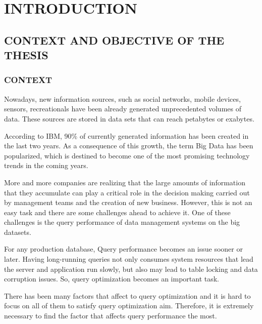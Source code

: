 
\chapter{INTRODUCTION}\label{chapter:introduction}

\section{CONTEXT AND OBJECTIVE OF THE THESIS}
\subsection{CONTEXT}
\begin{flushleft}
{\justify 
Nowadays, new information sources, such as social networks, mobile devices, sensors, recreationals have been already generated unprecedented volumes of data. These sources are stored in data sets that can reach petabytes or exabytes.
\par}
\vspace{0.5cm}
{\justify 
According to IBM, 90\% of currently generated information has been created in the last two years. As a consequence of this growth, the term Big Data has been popularized, which is destined to become one of the most promising technology trends in the coming years.
\par}
\vspace{0.5cm}
{\justify 
More and more companies are realizing that the large amounts of information that they accumulate can play a critical role in the decision making carried out by management teams and the creation of new business. However, this is not an easy task and there are some challenges ahead to achieve it. One of these challenges is the query performance of data management systems on the big datasets.
\par}
\vspace{0.5cm}
{\justify 
For any production database, Query performance becomes an issue sooner or later. Having long-running queries not only consumes system resources that lead the server and application run slowly, but also may lead to table locking and data corruption issues. So, query optimization becomes an important task.
\par}
\vspace{0.5cm}
{\justify 
There has been many factors that affect to query optimization and it is hard to focus on all of them to satisfy query optimization aim. Therefore, it is extremely necessary to find the factor that affects query performance the most.
\par}
\vspace{0.5cm}

\end{flushleft}

